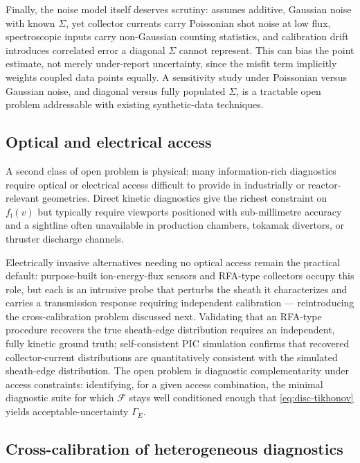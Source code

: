 Finally, the noise model itself deserves scrutiny:  assumes additive, Gaussian noise with known $\Sigma$, yet collector currents carry Poissonian shot noise at low flux, spectroscopic inputs carry non-Gaussian counting statistics, and calibration drift introduces correlated error a diagonal $\Sigma$ cannot represent. This can bias the point estimate, not merely under-report uncertainty, since the misfit term implicitly weights coupled data points equally. A sensitivity study under Poissonian versus Gaussian noise, and diagonal versus fully populated $\Sigma$, is a tractable open problem addressable with existing synthetic-data techniques.

\subsection{Optical and electrical access}
\label{subsec:disc-access}

A second class of open problem is physical: many information-rich diagnostics require optical or electrical access difficult to provide in industrially or reactor-relevant geometries. Direct kinetic diagnostics give the richest constraint on $f_{\mathrm{i}}(v)$ but typically require viewports positioned with sub-millimetre accuracy and a sightline often unavailable in production chambers, tokamak divertors, or thruster discharge channels.

Electrically invasive alternatives needing no optical access remain the practical default: purpose-built ion-energy-flux sensors \cite{ref0075} and RFA-type collectors occupy this role, but each is an intrusive probe that perturbs the sheath it characterizes and carries a transmission response requiring independent calibration — reintroducing the cross-calibration problem discussed next. Validating that an RFA-type procedure recovers the true sheath-edge distribution requires an independent, fully kinetic ground truth; self-consistent PIC simulation \cite{ref0631} confirms that recovered collector-current distributions are quantitatively consistent with the simulated sheath-edge distribution. The open problem is diagnostic complementarity under access constraints: identifying, for a given access combination, the minimal diagnostic suite for which $\mathcal{F}$ stays well conditioned enough that \cref{eq:disc-tikhonov} yields acceptable-uncertainty $\Gamma_{E}$.

\subsection{Cross-calibration of heterogeneous diagnostics}
\label{subsec:disc-crosscal}

